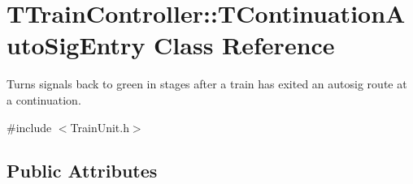\hypertarget{class_t_train_controller_1_1_t_continuation_auto_sig_entry}{}\section{T\+Train\+Controller\+:\+:T\+Continuation\+Auto\+Sig\+Entry Class Reference}
\label{class_t_train_controller_1_1_t_continuation_auto_sig_entry}


Turns signals back to green in stages after a train has exited an autosig route at a continuation.  




{\ttfamily \#include $<$Train\+Unit.\+h$>$}

\subsection*{Public Attributes}
